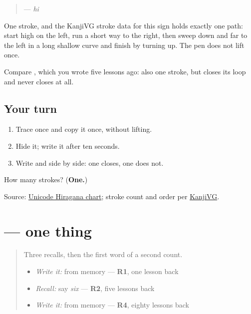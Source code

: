 \begin{quote}
\textbf{} — \emph{hi}
\end{quote}

One stroke, and the KanjiVG stroke data for this sign holds exactly one path: start high on the left, run a short way to the right, then sweep down and far to the left in a long shallow curve and finish by turning up. The pen does not lift once.

Compare \textbf{}, which you wrote five lessons ago: also one stroke, but \textbf{} closes its loop and \textbf{} never closes at all.

\subsection*{Your turn}
\begin{enumerate}
\raggedright
  \item Trace \textbf{} once and copy it once, without lifting.
  \item Hide it; write it after ten seconds.
  \item Write \textbf{} and \textbf{} side by side: one closes, one does not.
\end{enumerate}

\begin{tcolorbox}[breakable,colback=teal!4,colframe=teal!35!black,title={Before you move on}]
How many strokes? (\textbf{One.})

Source: \href{https://www.unicode.org/charts/PDF/U3040.pdf}{Unicode Hiragana chart}; stroke count and order per \href{https://kanjivg.tagaini.net/kanjivg/kanji/03072.html}{KanjiVG}.
\end{tcolorbox}
\section[\texorpdfstring{\ja{ひとつ} (hitotsu)}{ひとつ (hitotsu)}]{ — one thing}

\label{lesson:JA-C16-hitotsu}



\begin{quote}
Three recalls, then the first word of a second count.

\begin{itemize}
\raggedright
  \item \emph{Write it:} \textbf{} from memory — \textbf{R1}, one lesson back
  \item \emph{Recall:} say \emph{six} — \textbf{R2}, five lessons back
  \item \emph{Write it:} \textbf{} from memory — \textbf{R4}, eighty lessons back
\end{itemize}
\end{quote}

